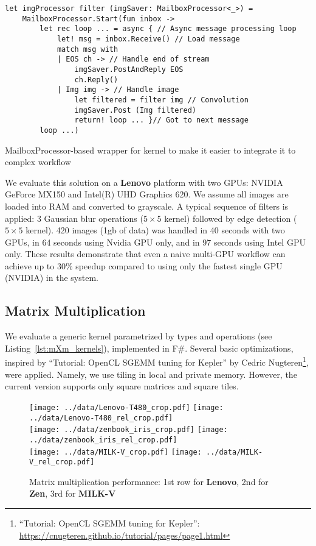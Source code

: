 \begin{listing}[h]
  \begin{verbatim}
let imgProcessor filter (imgSaver: MailboxProcessor<_>) =
    MailboxProcessor.Start(fun inbox ->
        let rec loop ... = async { // Async message processing loop
            let! msg = inbox.Receive() // Load message
            match msg with
            | EOS ch -> // Handle end of stream
                imgSaver.PostAndReply EOS
                ch.Reply()
            | Img img -> // Handle image
                let filtered = filter img // Convolution
                imgSaver.Post (Img filtered)
                return! loop ... }// Got to next message
        loop ...)
  \end{verbatim}
  \caption{MailboxProcessor-based wrapper for kernel to make it easier to integrate it to complex workflow}
  \label{lst:img_conv}
\end{listing}

We evaluate this solution on a \textbf{Lenovo} platform with two GPUs: NVIDIA GeForce MX150 and Intel(R) UHD Graphics 620.
We assume all images are loaded into RAM and converted to grayscale. 
A typical sequence of filters is applied: 3 Gaussian blur operations ($5 \times 5$ kernel) followed by edge detection ($5 \times 5$ kernel).
420 images (1gb of data) was handled in 40 seconds with two GPUs, in 64 seconds using Nvidia GPU only, and in 97 seconds using Intel GPU only.
These results demonstrate that even a naive multi-GPU workflow can achieve up to 30\% speedup compared to using only the fastest single GPU (NVIDIA) in the system.

\subsection{Matrix Multiplication}

We evaluate a generic kernel parametrized by types and operations (see Listing~\ref{lst:mXm_kernels}), implemented in F\#.
Several basic optimizations, inspired by ``Tutorial: OpenCL SGEMM tuning for Kepler'' by Cedric Nugteren\footnote{``Tutorial: OpenCL SGEMM tuning for Kepler'': \url{https://cnugteren.github.io/tutorial/pages/page1.html}}, were applied.
Namely, we use tiling in local and private memory.
However, the current version supports only square matrices and square tiles.

\begin{figure}
  \begin{center}
  \texttt{[image: ../data/Lenovo-T480\_crop.pdf]}
  \texttt{[image: ../data/Lenovo-T480\_rel\_crop.pdf]}\\
  \texttt{[image: ../data/zenbook\_iris\_crop.pdf]}
  \texttt{[image: ../data/zenbook\_iris\_rel\_crop.pdf]}\\
  \texttt{[image: ../data/MILK-V\_crop.pdf]}
  \texttt{[image: ../data/MILK-V\_rel\_crop.pdf]}
  \end{center}
  \caption{Matrix multiplication performance: 1st row for \textbf{Lenovo}, 2nd for \textbf{Zen}, 3rd for \textbf{MILK-V}}
  \label{fig:mxm_perf}
\end{figure}

